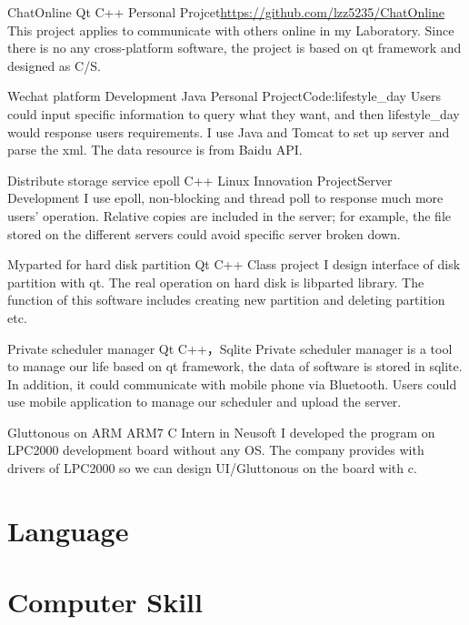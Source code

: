 \documentclass[11pt,a4paper]{moderncv}
\begin{document}
{ChatOnline}
{Qt C++}
{Personal Projcet}{\url{https://github.com/lzz5235/ChatOnline}}
{This project applies to communicate with others online in my Laboratory. Since there is no any cross-platform software, the project is based on qt framework and designed as C/S.}

{Wechat platform Development}
{Java}
{Personal Project}{Code:lifestyle\_day}
{Users could input specific information to query what they want, and then lifestyle\_day would response users requirements. I use Java and Tomcat to set up server and parse the xml. The data resource is from Baidu API.}

{Distribute storage service}
{epoll C++ Linux}
{Innovation Project}{Server Development}
{ I use epoll, non-blocking and thread poll to response much more users’ operation. Relative copies are included in the server; for example, the file stored on the different servers could avoid specific server broken down.}

{Myparted for hard disk partition}
{Qt C++}
{Class project}{}
{I design interface of disk partition with qt. The real operation on hard disk is libparted library. The function of this software includes creating new partition and deleting partition etc.}

{Private scheduler manager}
{Qt C++，Sqlite}
{}{}
{Private scheduler manager is a tool to manage our life based on qt framework, the data of software is stored in sqlite. In addition, it could communicate with mobile phone via Bluetooth. Users could use mobile application to manage our scheduler and upload the server.}

{Gluttonous on ARM}
{ARM7 C}
{Intern in Neusoft}{}
{I developed the program on LPC2000 development board without any OS. The company provides with drivers of LPC2000 so we can design UI/Gluttonous on the board with c.}

\section{Language }

\section{Computer Skill}
\end{document}
